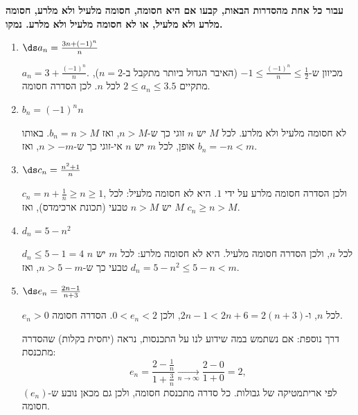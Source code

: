 \textbf{עבור כל אחת מהסדרות הבאות, קבעו אם היא חסומה, חסומה מלעיל ולא מלרע, חסומה מלרע ולא מלעיל, או לא חסומה מלעיל ולא מלרע. נמקו.}
\begin{enumerate}
\item $\ds a_n=\frac{3n+(-1)^n}{n}$
\begin{solbox}
$a_n=3+\frac{(-1)^n}{n}$.
מכיוון ש-$-1\le\frac{(-1)^n}{n}\le\frac12$
(האיבר הגדול ביותר מתקבל ב-$n=2$),
מתקיים
$2\le a_n\le3.5$
לכל $n$.
לכן הסדרה חסומה.
\end{solbox}
\item $b_n=(-1)^n n$
\begin{solbox}
לא חסומה מלעיל ולא מלרע.
לכל $M$ יש $n$ זוגי כך ש-$n>M$, ואז $b_n=n>M$.
באותו אופן, לכל $m$ יש $n$ אי-זוגי כך ש-$n>-m$, ואז $b_n=-n<m$.
\end{solbox}
\item $\ds c_n=\frac{n^2+1}{n}$
\begin{solbox}
$c_n=n+\frac1n\ge n\ge1$,
ולכן הסדרה חסומה מלרע על ידי $1$.
היא לא חסומה מלעיל:
לכל $M$ יש $n>M$ טבעי (תכונת ארכימדס), ואז $c_n\ge n>M$.
\end{solbox}
\item $d_n=5-n^2$
\begin{solbox}
$d_n\le5-1=4$
לכל $n$, ולכן הסדרה חסומה מלעיל.
היא לא חסומה מלרע:
לכל $m$ יש $n$ טבעי כך ש-$n>5-m$, ואז
$d_n=5-n^2\le5-n<m$.
\end{solbox}
\item $\ds e_n=\frac{2n-1}{n+3}$
\begin{solbox}
$e_n>0$
לכל $n$, ו-$2n-1<2n+6=2(n+3)$,
ולכן
$0<e_n<2$.
הסדרה חסומה.

דרך נוספת: אם נשתמש במה שידוע לנו על התכנסות, נראה (יחסית בקלות) שהסדרה מתכנסת:
$$e_n=\frac{2-\frac1n}{1+\frac3n}\xrightarrow[n\to\infty]{}\frac{2-0}{1+0}=2,$$
לפי אריתמטיקה של גבולות. כל סדרה מתכנסת חסומה, ולכן גם מכאן נובע ש-$(e_n)$ חסומה.
\end{solbox}
\eMs
\end{enumerate}
